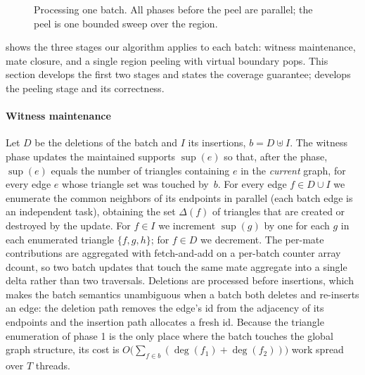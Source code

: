 \label{sec:method-region}

\begin{figure}[tb]
\centering
{}
\caption{Processing one batch. All phases before the peel are parallel; the peel is one bounded sweep over the region.}
\label{fig:framework}
\end{figure}

 shows the three stages our algorithm applies to each batch: witness maintenance, mate closure, and a single region peeling with virtual boundary pops.
This section develops the first two stages and states the coverage guarantee;  develops the peeling stage and its correctness.

\paragraph{Witness maintenance}
Let $D$ be the deletions of the batch and $I$ its insertions, $b=D\uplus I$.
The witness phase updates the maintained supports $\sup(e)$ so that, after the phase, $\sup(e)$ equals the number of triangles containing $e$ in the \emph{current} graph, for every edge $e$ whose triangle set was touched by~$b$.
For every edge $f\in D\cup I$ we enumerate the common neighbors of its endpoints in parallel (each batch edge is an independent task), obtaining the set $\Delta(f)$ of triangles that are created or destroyed by the update.
For $f\in I$ we increment $\sup(g)$ by one for each $g$ in each enumerated triangle $\{f,g,h\}$; for $f\in D$ we decrement.
The per-mate contributions are aggregated with fetch-and-add on a per-batch counter array $\mathrm{dcount}$, so two batch updates that touch the same mate aggregate into a single delta rather than two traversals.
Deletions are processed before insertions, which makes the batch semantics unambiguous when a batch both deletes and re-inserts an edge: the deletion path removes the edge's id from the adjacency of its endpoints and the insertion path allocates a fresh id.
Because the triangle enumeration of phase 1 is the only place where the batch touches the global graph structure, its cost is $O\!\big(\sum_{f\in b}(\deg(f_1)+\deg(f_2))\big)$ work spread over $T$ threads.

